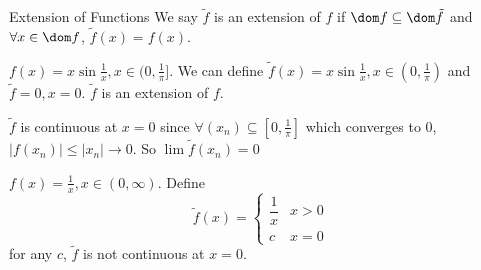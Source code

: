 \documentclass{report}
\begin{document}
\begin{definition}{Extension of Functions}
    We say $\tilde{f}$ is an extension of $f$ if $\dom f \subseteq \dom \tilde{f}$ and $\forall  x \in \dom f$, $\tilde{f}(x) = f(x)$.
\end{definition}

\begin{examples}
    \begin{example}
        $f(x) = x\sin{\frac{1}{x}}, x \in (0, \frac{1}{\pi}]$. We can define $\tilde{f}(x) = x\sin{\frac{1}{x}}, x \in (0, \frac{1}{\pi})$ and $\tilde{f} = 0, x = 0$. $\tilde{f}$ is an extension of $f$.

        $\tilde{f}$ is continuous at $x = 0$ since $\forall (x_{n}) \subseteq [0, \frac{1}{\pi}]$ which converges to $0$, $\lvert f(x_{n}) \rvert \leq \lvert x_{n} \rvert \rightarrow 0$. So $\lim \tilde{f}(x_{n}) = 0$
    \end{example}
    \begin{example}
        $f(x) = \frac{1}{x}, x \in (0, \infty)$. Define 
            \begin{equation*}
                \tilde{f}(x) = 
                    \begin{cases}
                        \dfrac{1}{x} & x > 0 \\
                        c & x = 0
                    \end{cases}
            \end{equation*}
        for any $c$, $\tilde{f}$ is not continuous at $x = 0$.
    \end{example}
\end{examples}
\end{document}
